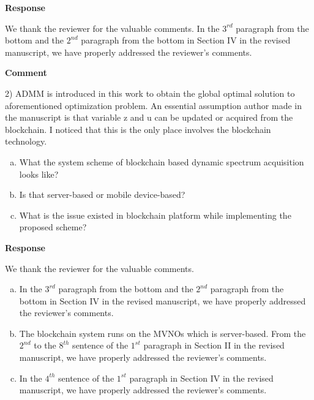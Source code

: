 \documentclass[12pt,draftcls, onecolumn]{IEEEtran}
\begin{document}
\vspace{3mm} \noindent\textcolor[rgb]{0.00,0.00,1.00}{\textbf{Response}}
\vspace{2mm}

We thank the reviewer for the valuable comments. In the $ 3^{rd} $ paragraph from the bottom and the $ 2^{nd} $ paragraph from the bottom in Section IV in the revised manuscript, we have properly addressed the reviewer's comments.


\vspace{3mm}
\noindent\textcolor[rgb]{1.00,0.00,0.00}{\textbf{Comment}}
\vspace{3mm}

2) ADMM is introduced in this work to obtain the global optimal
solution to aforementioned optimization problem. An essential assumption author made in the manuscript is that variable z and u can be updated or acquired from the blockchain. I noticed that this is the only place involves the blockchain technology. 
\begin{enumerate}[(a)]
	\item What the system scheme of blockchain based dynamic spectrum acquisition looks like?
	\item Is that server-based or mobile device-based? 
	\item What is the issue existed in blockchain platform while implementing the proposed scheme?
\end{enumerate}
 



\vspace{3mm} \noindent\textcolor[rgb]{0.00,0.00,1.00}{\textbf{Response}}
\vspace{2mm}

We thank the reviewer for the valuable comments. 
 \begin{enumerate}[(a)]
	\item In the $ 3^{rd} $ paragraph from the bottom and the $ 2^{nd} $ paragraph from the bottom in Section IV in the revised manuscript, we have properly addressed the reviewer's comments.
	
	\item The blockchain system runs on the MVNOs which is server-based. From the $ 2^{nd} $ to the $ 8^{th} $ sentence of the $ 1^{st} $ paragraph in Section II in the revised manuscript, we have properly addressed the reviewer's comments.
	
	\item  In the $ 4^{th} $ sentence of the $ 1^{st} $ paragraph in Section IV in the revised manuscript, we have properly addressed the reviewer's comments.
\end{enumerate}
\end{document}
